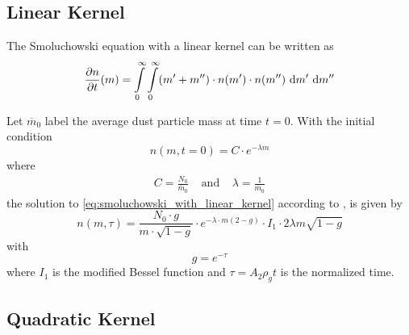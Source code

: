     \subsection{Linear Kernel}


    The Smoluchowski equation with a linear kernel can be written as
    \begin{equation}
        \frac{\partial n}{\partial t}(m)
            = 
                \int\limits_0^\infty \int\limits_0^\infty
                (m' + m'') \cdot
                n(m') \cdot n(m'')
                \ \text{d} m' \ \text{d} m''
        \label{eq:smoluchowski_with_linear_kernel}
    \end{equation}

    Let $\overline m_0$ label the average dust particle mass at time $t=0$.
    With the initial condition 
    \begin{equation}
        n(m, t=0) = C \cdot e^{-\lambda m}
    \end{equation}
    where 
    \begin{align}
        C = \frac{N_0}{\overline m_0}
        \ \ \ \ \ \text{and} \ \ \ \ \
        \lambda = \frac{1}{\overline m_0}
    \end{align}
    the solution to \cref{eq:smoluchowski_with_linear_kernel} according to
    \cite{safronov_1963}, \cite{safronov_1972} is given by 
    \begin{equation}
        n(m, \tau) = \frac{N_0 \cdot g}{m \cdot \sqrt{1-g}} \cdot e^{-\lambda \cdot m(2-g)}
        \cdot I_1 \cdot 2\lambda m \sqrt{1-g}
    \end{equation}
    with
    \begin{equation}
        g = e^{-\tau}
    \end{equation}
    where $I_1$ is the modified Bessel function and $\tau = A_2 \rho_g t$ is the normalized time.

    \subsection{Quadratic Kernel}


